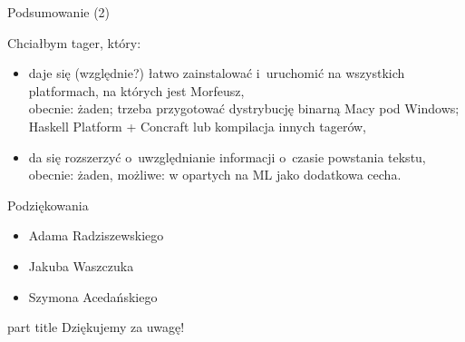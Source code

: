 \documentclass[xcolor=dvipsnames,polish]{beamer}
\begin{document}
\begin{frame}{Podsumowanie (2)}
  \vspace{0.5cm}

  Chciałbym tager, który:
   \begin{itemize}
    \item<1-> daje się (względnie?) łatwo zainstalować i~uruchomić na wszystkich platformach, na których jest Morfeusz,\\
    \alert{obecnie: żaden; trzeba przygotować dystrybucję binarną Macy pod Windows; Haskell Platform + Concraft lub kompilacja innych tagerów,}
    \item<2-> da się rozszerzyć o~uwzględnianie informacji o~czasie powstania tekstu,\\
    \alert{obecnie: żaden, możliwe: w opartych na ML jako dodatkowa cecha.}
  \end{itemize}
\end{frame}

\begin{frame}{Podziękowania}
  \begin{itemize}
    \item Adama Radziszewskiego
    \item Jakuba Waszczuka
    \item Szymona Acedańskiego
  \end{itemize}
\end{frame}

\begin{frame}{}
\begin{centering}
    \begin{beamercolorbox}[sep=12pt,center]{part title}
    Dziękujemy za uwagę!\par
    \end{beamercolorbox}
    \end{centering}
\end{frame}
\end{document}
